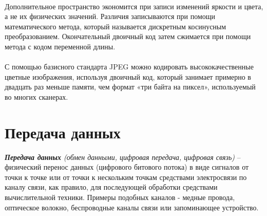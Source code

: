 \\Дополнительное пространство экономится при записи изменений яркости и цвета, а не их физических значений. Различия записываются при помощи математического метода, который называется дискретным косинусным преобразованием. Окончательный двоичный код затем сжимается при помощи метода  с кодом переменной длины.\\
\\С помощью базисного стандарта  JPEG можно кодировать высококачественные цветные изображения, используя двоичный код, который занимает примерно в двадцать раз меньше памяти, чем формат «три байта на пиксел», используемый во многих сканерах.
\section{Передача данных}
\emph{\textbf{Передача данных} (обмен данными, цифровая передача, цифровая связь)} -- физический перенос данных (цифрового битового потока) в виде сигналов от точки к точке или от точки к нескольким точкам средствами электросвязи по каналу связи, как правило, для последующей обработки средствами вычислительной техники. Примеры подобных каналов - медные провода, оптическое волокно, беспроводные каналы связи или запоминающее устройство.\\
